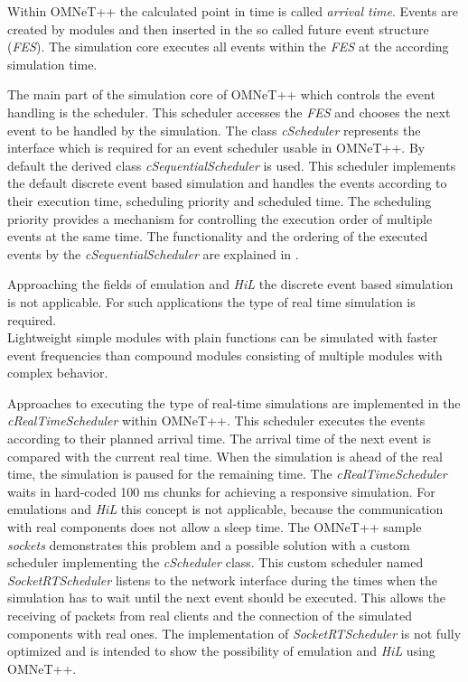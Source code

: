 Within OMNeT++ the calculated point in time is called \emph{arrival time}.
Events are created by modules and then inserted in the so called future event structure (\emph{FES}).
The simulation core executes all events within the \emph{FES} at the according simulation time.

The main part of the simulation core of OMNeT++ which controls the event handling is the scheduler.
This scheduler accesses the \emph{FES} and chooses the next event to be handled by the simulation.
The class \emph{cScheduler} represents the interface which is required for an event scheduler usable in OMNeT++.
By default the derived class \emph{cSequentialScheduler} is used.
This scheduler implements the default discrete event based simulation and handles the events according to their execution time, scheduling priority and scheduled time.
The scheduling priority provides a mechanism for controlling the execution order of multiple events at the same time.
The functionality and the ordering of the executed events by the \emph{cSequentialScheduler} are explained in \cite[section 4.1]{omnet_manual}.

Approaching the fields of emulation and \emph{HiL} the discrete event based simulation is not applicable.
For such applications the type of real time simulation is required.
\\



Lightweight simple modules with plain functions can be simulated with faster event frequencies than compound modules consisting of multiple modules with complex behavior.

Approaches to executing the type of real-time simulations are implemented in the \emph{cRealTimeScheduler} within OMNeT++.
This scheduler executes the events according to their planned arrival time.
The arrival time of the next event is compared with the current real time.
When the simulation is ahead of the real time, the simulation is paused for the remaining time.
The \emph{cRealTimeScheduler} waits in hard-coded 100 ms chunks for achieving a responsive simulation.
For emulations and \emph{HiL} this concept is not applicable, because the communication with real components does not allow a sleep time.
The OMNeT++ sample \emph{sockets} demonstrates this problem and a possible solution with a custom scheduler implementing the \emph{cScheduler} class.
This custom scheduler named \emph{SocketRTScheduler} listens to the network interface during the times when the simulation has to wait until the next event should be executed.
This allows the receiving of packets from real clients and the connection of the simulated components with real ones.
The implementation of \emph{SocketRTScheduler} is not fully optimized and is intended to show the possibility of emulation and \emph{HiL} using OMNeT++.

